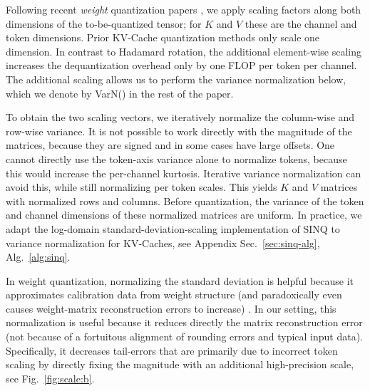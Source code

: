 \documentclass{llmxive}
\begin{document}
Following recent \emph{weight} quantization papers \cite{muller2025sinq}, we apply scaling factors along both dimensions of the to-be-quantized tensor; for $K$ and $V$ these are the channel and token dimensions. Prior KV-Cache quantization methods only scale one dimension. In contrast to Hadamard rotation, the additional element-wise scaling increases the dequantization overhead only by one FLOP per token per channel. The additional scaling allows us to perform the variance normalization below, which we denote by VarN() in the rest of the paper. %

To obtain the two scaling vectors, we iteratively normalize the column-wise and row-wise variance.
It is not possible to work directly with the magnitude of the matrices, because they are signed and in some cases have large offsets. One cannot directly use the token-axis variance alone to normalize tokens, because this would increase the per-channel kurtosis. Iterative variance normalization can avoid this, while still normalizing per token scales. 
This yields $K$ and $V$ matrices with normalized rows and columns. Before quantization, the variance of the token and channel dimensions of these normalized matrices are uniform. In practice, we adapt the log-domain standard-deviation-scaling implementation of SINQ \cite{muller2025sinq} to variance normalization for KV-Caches, see Appendix Sec.~\ref{sec:sinq-alg}, Alg.~\ref{alg:sinq}.

 In weight quantization, normalizing the standard deviation is helpful because it approximates calibration data from weight structure (and paradoxically even causes weight-matrix reconstruction errors to increase) \cite{muller2025sinq}. In our setting, this normalization is useful because it reduces directly the matrix reconstruction error (not because of a fortuitous alignment of rounding errors and typical input data). Specifically, it decreases tail-errors that are primarily due to incorrect token scaling by directly fixing the magnitude with an additional high-precision scale, see Fig.~\ref{fig:scale:b}.
\end{document}
